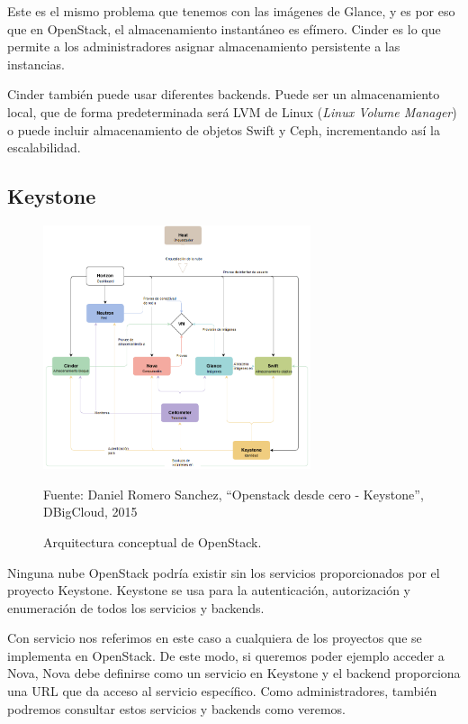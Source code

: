 Este es el mismo problema que tenemos con las imágenes de Glance, y es por eso que en OpenStack, el almacenamiento instantáneo es efímero. Cinder es lo que permite a los administradores asignar almacenamiento persistente a las instancias.

Cinder también puede usar diferentes backends. Puede ser un almacenamiento local, que de forma predeterminada será LVM de Linux (\textit{Linux Volume Manager}) o puede incluir almacenamiento de objetos Swift y Ceph, incrementando así la escalabilidad.

\subsection{Keystone}
\begin{figure}
    \centering
    \includegraphics[width=0.7\textwidth]{imagenes/capitulo4/arquitectura1.png}
    \caption{Arquitectura conceptual de OpenStack.}
	\vspace{0.3cm}
    \footnotesize{Fuente: Daniel Romero Sanchez, “Openstack desde cero - Keystone”, DBigCloud, 2015} 
    \label{arquitecturaOpenStack}
\end{figure}

Ninguna nube OpenStack podría existir sin los servicios proporcionados por el proyecto Keystone. Keystone se usa para la autenticación, autorización y enumeración de todos los servicios y backends.\cite{noauthor_keystone_nodate}

Con servicio nos referimos en este caso a cualquiera de los proyectos que se implementa en OpenStack. De este modo, si queremos poder ejemplo acceder a Nova, Nova debe definirse como un servicio en Keystone y el backend proporciona una URL que da acceso al servicio específico. Como administradores, también podremos consultar estos servicios y backends como veremos.

